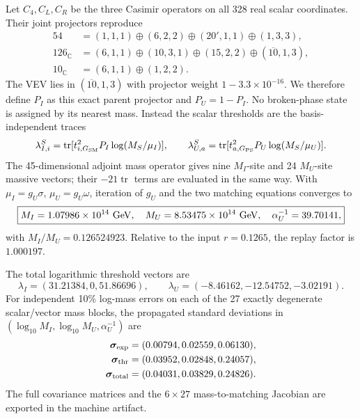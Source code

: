 \documentclass[11pt]{article}
\newcommand{\tr}{\operatorname{tr}}
\newcommand{\PS}{G_{\rm PS}}
\newcommand{\SM}{G_{\rm SM}}
\begin{document}
Let $C_4,C_L,C_R$ be the three Casimir operators on all 328 real scalar
coordinates.  Their joint projectors reproduce
\begin{align}
54&=(1,1,1)\oplus(6,2,2)\oplus(20',1,1)\oplus(1,3,3),\nonumber\\
126_{\mathbb C}&=(6,1,1)\oplus(10,3,1)\oplus(15,2,2)
                 \oplus(\overline{10},1,3),\nonumber\\
10_{\mathbb C}&=(6,1,1)\oplus(1,2,2).
\end{align}
The VEV lies in $(\overline{10},1,3)$ with projector weight
$1-3.3\times10^{-16}$.  We therefore define $P_I$ as this exact parent
projector and $P_U=1-P_I$.  No broken-phase state is assigned by its nearest
mass.  Instead the scalar thresholds are the basis-independent traces
\begin{equation}
 \lambda^S_{I,i}=\tr[t_{i,\SM}^2P_I\log(M_S/\mu_I)],\qquad
 \lambda^S_{U,a}=\tr[t_{a,\PS}^2P_U\log(M_S/\mu_U)].
 \label{eq:spectraltrace}
\end{equation}
The 45-dimensional adjoint mass operator gives nine $M_I$-site and 24
$M_U$-site massive vectors; their $-21\tr$ terms are evaluated in the same
way.  With $\mu_I=g_U\sigma$, $\mu_U=g_U\omega$, iteration of $g_U$ and the
two matching equations converges to
\begin{equation}
 \boxed{M_I=1.07986\times10^{14}\ {\rm GeV},\quad
 M_U=8.53475\times10^{14}\ {\rm GeV},\quad
 \alpha_U^{-1}=39.70141,}
 \label{eq:thresholdfixedpoint}
\end{equation}
with $M_I/M_U=0.126524923$.  Relative to the input $r=0.1265$, the replay
factor is $1.000197$.

The total logarithmic threshold vectors are
\begin{equation}
 \lambda_I=(31.21384,0,51.86696),\qquad
 \lambda_U=(-8.46162,-12.54752,-3.02191).
 \label{eq:twositelambda}
\end{equation}
For independent 10\% log-mass errors on each of the 27 exactly degenerate
scalar/vector mass blocks, the propagated standard deviations in
$(\log_{10}M_I,\log_{10}M_U,\alpha_U^{-1})$ are
\begin{align}
 \bm\sigma_{\rm exp}&=(0.00794,0.02559,0.06130),\nonumber\\
 \bm\sigma_{\rm thr}&=(0.03952,0.02848,0.24057),\nonumber\\
 \bm\sigma_{\rm total}&=(0.04031,0.03829,0.24826).
 \label{eq:twositecovariance}
\end{align}
The full covariance matrices and the $6\times27$ mass-to-matching Jacobian
are exported in the machine artifact.
\end{document}
